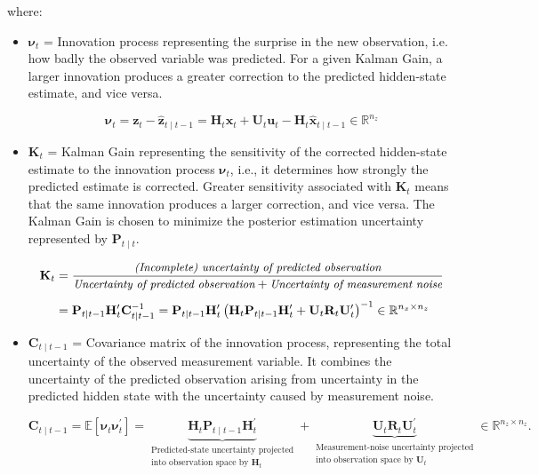 \documentclass[11pt]{article}
\newcommand{\trans}{^{\prime}}
\begin{document}
where:

\begin{itemize}
    \item $\boldsymbol{\nu}_t$ = Innovation process representing the surprise in the new observation, i.e. how badly the observed variable was predicted. For a given Kalman Gain, a larger innovation produces a greater correction to the predicted hidden-state estimate, and vice versa.

    \[
    \boldsymbol{\nu}_t
    =
    \mathbf{z}_t-\widehat{\mathbf{z}}_{t\mid t-1}
    =
    \mathbf{H}_t\mathbf{x}_t+\mathbf{U}_t\mathbf{u}_t
    -\mathbf{H}_t\widehat{\mathbf{x}}_{t\mid t-1}
    \in\mathbb{R}^{n_z}
    \]

    \item $\mathbf{K}_t$ = Kalman Gain representing the sensitivity of the corrected hidden-state estimate to the innovation process $\boldsymbol{\nu}_t$, i.e., it determines how strongly the predicted estimate is corrected. Greater sensitivity associated with $\mathbf{K}_t$ means that the same innovation produces a larger correction, and vice versa. The Kalman Gain is chosen to minimize the posterior estimation uncertainty represented by $\mathbf{P}_{t\mid t}$.

    \[
    \begin{aligned}
    \mathbf{K}_t
    &=
    \frac{
    \text{\small\itshape (Incomplete) uncertainty of predicted observation}
    }{
    \text{\small\itshape Uncertainty of predicted observation}
    +
    \text{\small\itshape Uncertainty of measurement noise}
    }
    \\[0.5em]
    &=
    \mathbf{P}_{t\mid t-1}\mathbf{H}_t\trans\mathbf{C}_{t\mid t-1}^{-1}
    =
    \mathbf{P}_{t\mid t-1}\mathbf{H}_t\trans
    \left(
    \mathbf{H}_t\mathbf{P}_{t\mid t-1}\mathbf{H}_t\trans
    +
    \mathbf{U}_t\mathbf{R}_t\mathbf{U}_t\trans
    \right)^{-1}
    \in\mathbb{R}^{n_x\times n_z}
    \end{aligned}
    \]

    \item $\mathbf{C}_{t\mid t-1}$ = Covariance matrix of the innovation process, representing the total uncertainty of the observed measurement variable. It combines the uncertainty of the predicted observation arising from uncertainty in the predicted hidden state with the uncertainty caused by measurement noise.

    \[
    \mathbf{C}_{t\mid t-1}
    =
    \mathbb{E}\!\left[
    \boldsymbol{\nu}_t\boldsymbol{\nu}_t\trans
    \right]
    =
    \underbrace{
    \mathbf{H}_t\mathbf{P}_{t\mid t-1}\mathbf{H}_t\trans
    }_{\substack{
    \text{Predicted-state uncertainty projected}\\
    \text{into observation space by }\mathbf{H}_t
    }}
    +
    \underbrace{
    \mathbf{U}_t\mathbf{R}_t\mathbf{U}_t\trans
    }_{\substack{
    \text{Measurement-noise uncertainty projected}\\
    \text{into observation space by }\mathbf{U}_t
    }}
    \in\mathbb{R}^{n_z\times n_z}.
    \]


\end{itemize}
\end{document}
